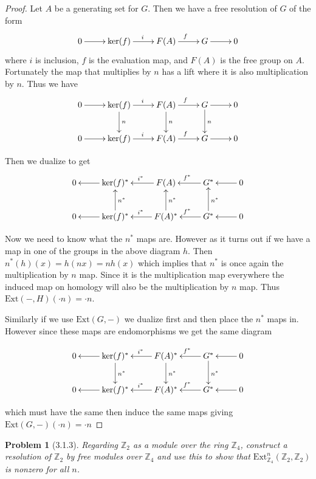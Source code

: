 \documentclass[10pt]{article}
\newcommand{\sk}{\vskip 10mm}
\newcommand{\bb}[1]{\mathbb{#1}}
\newcommand{\Ext}{\mathrm{Ext}}
\theoremstyle{plain}
\newtheorem{problem}{Problem}
\theoremstyle{remark}
\begin{document}
\begin{proof}
  Let $A$ be a generating set for $G$. Then we have a free resolution of
  $G$ of the form
  \[
    \xymatrix{
      0 \ar[r] & \ker(f) \ar[r]^i & F(A) \ar[r]^f & G \ar[r] & 0\\ 
    }
  \]
  where $i$ is inclusion, $f$ is the evaluation map, and $F(A)$ is the
  free group on $A$. Fortunately the map that multiplies by $n$ has a lift
  where it is also multiplication by $n$. Thus we have
  \[
    \xymatrix{
      0 \ar[r] & \ker(f) \ar[r]^i \ar[d]^n & F(A) \ar[r]^f \ar[d]^n & G \ar[r] \ar[d]^n & 0\\
      0 \ar[r] & \ker(f) \ar[r]^i & F(A) \ar[r]^f & G \ar[r] & 0\\ 
    }
  \]

  Then we dualize to get
  \[
    \xymatrix{
      0 & \ker(f)^* \ar[l] & F(A) \ar[l]_{i^*} & G^* \ar[l]_{f^*} & \ar[l] 0\\
      0 & \ker(f)^* \ar[l] \ar[u]_{n^*} & F(A)^* \ar[l]_{i^*} \ar[u]_{n^*} & G^* \ar[l]_{f^*} \ar[u]_{n^*} & \ar[l] 0\\ 
    }
  \]

  Now we need to know what the $n^*$ maps are. However as it turns out if we
  have a map in one of the groups in the above diagram $h$. Then
  $n^*(h)(x)=h(nx)=nh(x)$ which implies that $n^*$ is once again the multiplication
  by $n$ map. Since it is the multiplication map everywhere the induced map on
  homology will also be the multiplication by $n$ map. Thus $\Ext(-,H)(\cdot n)=\cdot n$.

  Similarly if we use $\Ext(G,-)$ we dualize first and then place the $n^*$ maps in.
  However since these maps are endomorphisms we get the same diagram

  \[
    \xymatrix{
      0 & \ker(f)^* \ar[l] \ar[d]^{n^*}& F(A)^* \ar[l]_{i^*} \ar[d]^{n^*}& G^* \ar[l]_{f^*} \ar[d]^{n^*}& \ar[l] 0\\
      0 & \ker(f)^* \ar[l] & F(A)^* \ar[l]_{i^*} & G^* \ar[l]_{f^*} & \ar[l] 0\\ 
    }
  \]

  which must have the same then induce the same maps giving $\Ext(G,-)(\cdot n)=\cdot n$
\end{proof}

\sk

\begin{problem}[3.1.3]
  Regarding $\bb{Z}_2$ as a module over the ring $\bb{Z}_4$, construct a
  resolution of $\bb{Z}_2$ by free modules over $\bb{Z}_4$ and use this to show
  that $\Ext_{\bb{Z}_4}^n(\bb{Z}_2,\bb{Z}_2)$ is nonzero for all $n$.
\end{problem}
\end{document}
